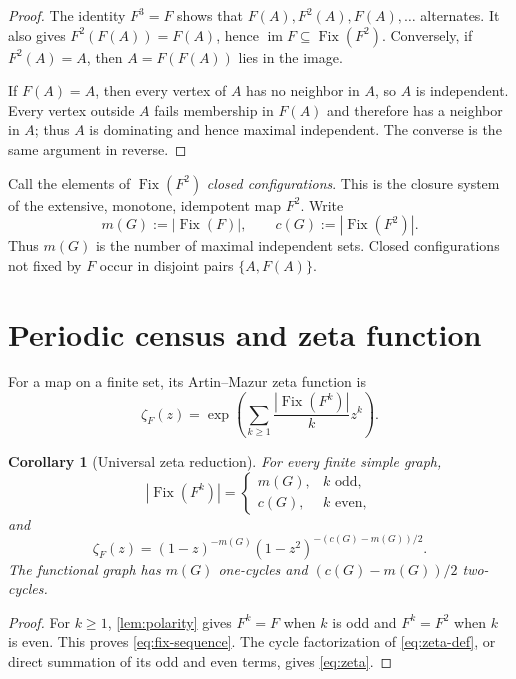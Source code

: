 \documentclass[11pt,a4paper]{amsart}
\newtheorem{corollary}[theorem]{Corollary}
\theoremstyle{definition}
\theoremstyle{remark}
\newcommand{\Fix}{\operatorname{Fix}}
\newcommand{\im}{\operatorname{im}}
\begin{document}
\begin{proof}
The identity $F^3=F$ shows that $F(A),F^2(A),F(A),\ldots$ alternates.
It also gives $F^2(F(A))=F(A)$, hence $\im F\subseteq\Fix(F^2)$.
Conversely, if $F^2(A)=A$, then $A=F(F(A))$ lies in the image.

If $F(A)=A$, then every vertex of $A$ has no neighbor in $A$, so $A$ is
independent.  Every vertex outside $A$ fails membership in $F(A)$ and
therefore has a neighbor in $A$; thus $A$ is dominating and hence maximal
independent.  The converse is the same argument in reverse.
\end{proof}

Call the elements of $\Fix(F^2)$ \emph{closed configurations}.  This is
the closure system of the extensive, monotone, idempotent map $F^2$.
Write
\begin{equation}\label{eq:mc}
 m(G):=|\Fix(F)|,\qquad c(G):=|\Fix(F^2)|.
\end{equation}
Thus $m(G)$ is the number of maximal independent sets.  Closed
configurations not fixed by $F$ occur in disjoint pairs $\{A,F(A)\}$.

\section{Periodic census and zeta function}

For a map on a finite set, its Artin--Mazur zeta function is
\begin{equation}\label{eq:zeta-def}
 \zeta_F(z)=\exp\left(\sum_{k\ge1}\frac{|\Fix(F^k)|}{k}z^k\right).
\end{equation}

\begin{corollary}[Universal zeta reduction]\label{cor:zeta}
For every finite simple graph,
\begin{equation}\label{eq:fix-sequence}
 |\Fix(F^k)|=
 \begin{cases}
 m(G),&k\text{ odd},\\
 c(G),&k\text{ even},
 \end{cases}
\end{equation}
and
\begin{equation}\label{eq:zeta}
 \boxed{\displaystyle
 \zeta_F(z)=(1-z)^{-m(G)}
 (1-z^2)^{-(c(G)-m(G))/2}.}
\end{equation}
The functional graph has $m(G)$ one-cycles and
$(c(G)-m(G))/2$ two-cycles.
\end{corollary}

\begin{proof}
For $k\ge1$, \cref{lem:polarity} gives $F^k=F$ when $k$ is odd and
$F^k=F^2$ when $k$ is even.  This proves \eqref{eq:fix-sequence}.  The
cycle factorization of \eqref{eq:zeta-def}, or direct summation of its odd
and even terms, gives \eqref{eq:zeta}.
\end{proof}
\end{document}
